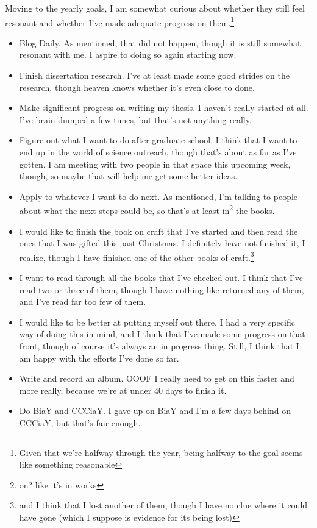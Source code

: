 \documentclass[12pt]{article}[titlepage]
\renewcommand{\,}{\textsuperscript{,}}
\begin{document}
Moving to the yearly goals, I am somewhat curious about whether they still feel resonant and whether I've made adequate progress on them.\footnote{Given that we're halfway through the year, being halfway to the goal seems like something reasonable}

\begin{itemize}
\item Blog Daily. As mentioned, that did not happen, though it is still somewhat resonant with me.
I aspire to doing so again starting now.
\item Finish dissertation research. I've at least made some good strides on the research, though heaven knows whether it's even close to done.
\item Make significant progress on writing my thesis. I haven't really started at all. I've brain dumped a few times, but that's not anything really.
\item Figure out what I want to do after graduate school. I think that I want to end up in the world of science outreach, though that's about as far as I've gotten.
I am meeting with two people in that space this upcoming week, though, so maybe that will help me get some better ideas.
\item Apply to whatever I want to do next.
As mentioned, I'm talking to people about what the next steps could be, so that's at least in\footnote{on? like it's in works} the books.
\item I would like to finish the book on craft that I've started and then read the ones that I was gifted this past Christmas. 
I definitely have not finished it, I realize, though I have finished one of the other books of craft.\footnote{and I think that I lost another of them, though I have no clue where it could have gone (which I suppose is evidence for its being lost)}
\item I want to read through all the books that I've checked out.
I think that I've read two or three of them, though I have nothing like returned any of them, and I've read far too few of them.
\item I would like to be better at putting myself out there. I had a very specific way of doing this in mind, and I think that I've made some progress on that front, though of course it's always an in progress thing. Still, I think that I am happy with the efforts I've done so far.
\item Write and record an album. OOOF I really need to get on this faster and more really, because we're at under 40 days to finish it.
\item Do BiaY and CCCiaY. I gave up on BiaY and I'm a few days behind on CCCiaY, but that's fair enough.

\end{itemize}
\end{document}
